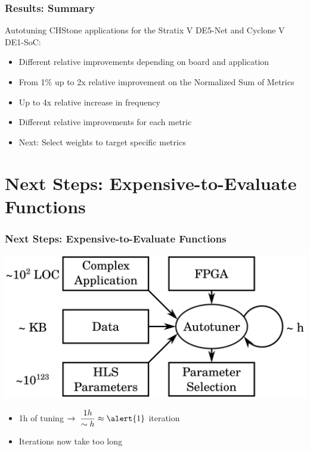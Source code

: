\documentclass[10pt, compress, aspectratio=169]{beamer}
\begin{document}
\begin{frame}
    \frametitle{Results: Summary}
    Autotuning CHStone applications for the \alert{Stratix V DE5-Net} and
    \alert{Cyclone V DE1-SoC}:
    \begin{itemize}
        \item \alert{Different relative improvements} depending on \alert{board and application}
        \item From \alert{1\% up to 2x relative improvement} on the \alert{Normalized Sum of Metrics}
        \item Up to \alert{4x relative increase in frequency}
        \item Different relative improvements \alert{for each metric}
        \item Next: \alert{Select weights to target specific metrics}
    \end{itemize}
\end{frame}

\section{Next Steps: Expensive-to-Evaluate Functions}

\begin{frame}
    \frametitle{Next Steps: Expensive-to-Evaluate Functions}
    \begin{center}
        \includegraphics[width=.73\textwidth]{overview_fpgas_big}
    \end{center}

    \begin{itemize}
        \item \alert{1h} of tuning $\rightarrow \; \dfrac{1h}{\sim{}h} \approx \alert{1}$ \alert{iteration}
        \item Iterations now \alert{take too long}
    \end{itemize}
\end{frame}
\end{document}
